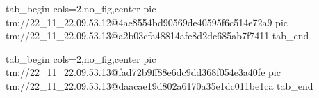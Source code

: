  
 
 
 
 

\qqSecOrig


\ifcmt
  tab_begin cols=2,no_fig,center
    pic tm://22_11_22.09.53.12@4ae8554bd90569de40595f6c514e72a9
    pic tm://22_11_22.09.53.13@a2b03cfa48814afe8d2dc685ab7f7411
  tab_end
\fi


\ifcmt
  tab_begin cols=2,no_fig,center
    pic tm://22_11_22.09.53.13@fad72b9ff88e6dc9dd368f054e3a40fe
    pic tm://22_11_22.09.53.13@daacae19d802a6170a35e1dc011be1ca
  tab_end
\fi

